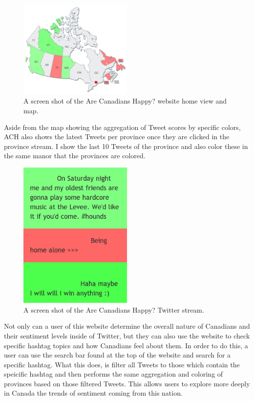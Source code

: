 \documentclass[conference]{IEEEtran}
\begin{document}
\begin{figure}[tb!]
\centering
\includegraphics[width=0.5\textwidth]{images/map.png}
\caption{A screen shot of the Are Canadians Happy? website home view and map.\label{fig:map}}
\end{figure}

Aside from the map showing the aggregation of Tweet scores by specific colors, ACH also shows the latest
Tweets per province once they are clicked in the province stream. I show the last 10 Tweets of the province
and also color these in the same manor that the provinces are colored.

\begin{figure}[tb!]
\centering
\includegraphics[width=0.5\textwidth]{images/stream.png}
\caption{A screen shot of the Are Canadians Happy? Twitter stream.\label{fig:stream}}
\end{figure}

Not only can a user of this website determine the overall nature of Canadians and their sentiment
levels inside of Twitter, but they can also use the website to check specific hashtag topics and how
Canadians feel about them. In order to do this, a user can use the search bar found at the top of the
website and search for a specific hashtag. What this does, is filter all Tweets to those which contain
the speicific hashtag and then performs the same aggregation and coloring of provinces based on those
filtered Tweets. This allows users to explore more deeply in Canada the trends of sentiment coming from
this nation.
\end{document}
